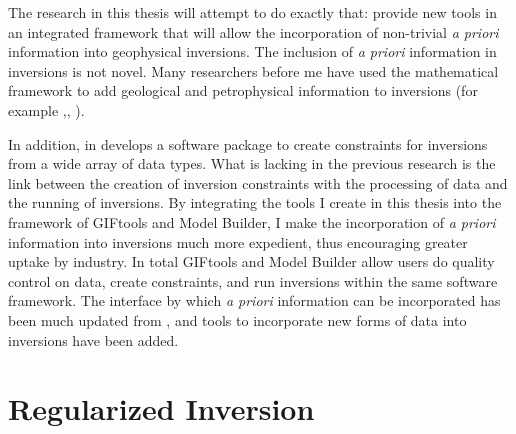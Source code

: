 The research in this thesis will attempt to do exactly that: provide new tools in an integrated framework that will allow the incorporation of non-trivial \emph{a priori} information into geophysical inversions. The inclusion of \emph{a priori} information in inversions is not novel. Many researchers before me have used the mathematical framework to add geological and petrophysical information to inversions (for example \citealt{Lelievre2009Integrating},\citealt{phillips2001thesis}, \citealt{farquharson2008geologically}). 

In addition, in \cite{williams2008geologically} develops a software package to create constraints for inversions from a wide array of data types. What is lacking in the previous research is the link between the creation of inversion constraints with the processing of data and the running of inversions. By integrating the tools I create in this thesis into the framework of GIFtools and Model Builder, I make the incorporation of \emph{a priori} information into inversions much more expedient, thus encouraging greater uptake by industry.  In total GIFtools and Model Builder allow users do quality control on data, create constraints, and run inversions within the same software framework. The interface by which \emph{a priori} information can be incorporated has been much updated from \cite{williams2008geologically}, and tools to incorporate new forms of data into inversions have been added. 




\section{Regularized Inversion}
\label{sec:Regularized Inversion}

